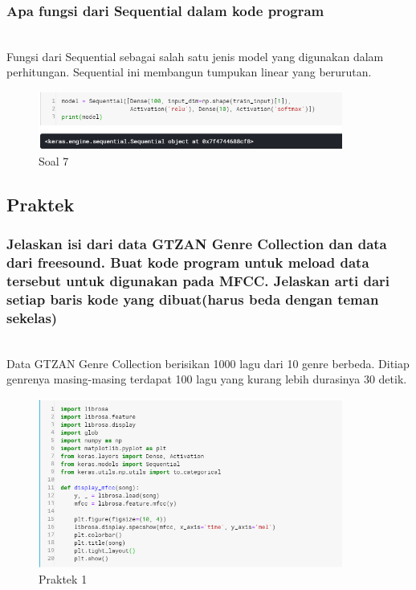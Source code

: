 	\subsubsection{Apa fungsi dari Sequential dalam kode program}
	\hfill\\
	Fungsi dari Sequential sebagai salah satu jenis model yang digunakan dalam perhitungan. Sequential ini membangun tumpukan linear yang berurutan.
	\begin{figure}[H]
		\begin{center}
		 \includegraphics[width=10cm]{figures/1174076/figures6/teori8.png}
		 \caption{Soal 7}	
		\end{center}
	\end{figure}
	
\subsection{Praktek}
 
	\subsubsection{Jelaskan isi dari data GTZAN Genre Collection dan data dari freesound. Buat kode program untuk meload data tersebut untuk digunakan pada MFCC. Jelaskan arti dari setiap baris kode yang dibuat(harus beda dengan teman sekelas)}
\hfill\\
Data GTZAN Genre Collection berisikan 1000 lagu dari 10 genre berbeda. Ditiap genrenya masing-masing terdapat 100 lagu yang kurang lebih durasinya 30 detik.

	
	
	\begin{figure}[H]
		\begin{center}
		 \includegraphics[width=10cm]{figures/1174076/figures6/praktek1.png}
		 \caption{Praktek 1}	
		\end{center}
	\end{figure}
 
